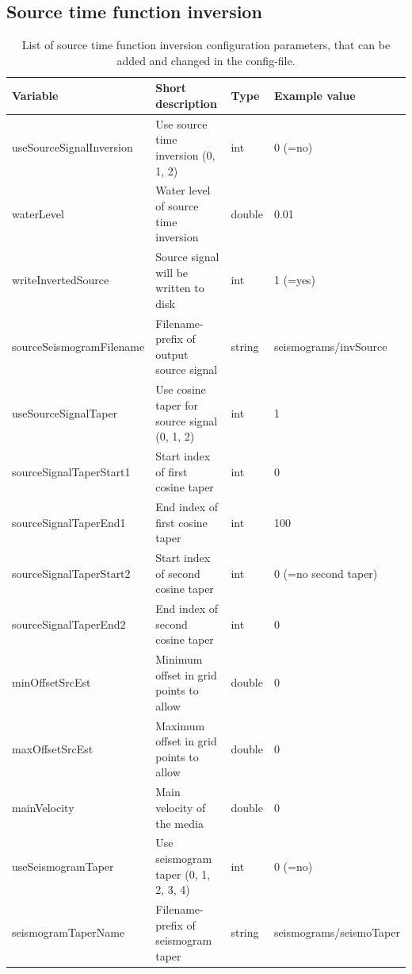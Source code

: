\documentclass[pdftex,a4paper,parskip,listof=totoc,bibliography=totoc,onehalfspacing,12pt]{scrreprt}
\begin{document}
\subsection{Source time function inversion}
\begin{table}[h!]
\caption[List of source time function inversion configuration parameters.]{List of source time function inversion configuration parameters, that can be added and changed in the config-file.}\label{tab:config_sourcetime}
\centering
\begin{adjustbox}{width=1\textwidth,center=\textwidth}
	\begin{tabular}{llll}
	\toprule
         Variable                 & Short description                                                   & Type   & Example value \\
	\midrule
         useSourceSignalInversion & Use source time inversion (0, 1, 2)                                          &  int   & 0 (=no) \\
         waterLevel               & Water level of source time inversion                                & double & 0.01 \\
         writeInvertedSource      & Source signal will be written to disk                               &  int   & 1 (=yes) \\
         sourceSeismogramFilename & Filename-prefix of output source signal                               & string & seismograms/invSource \\
         useSourceSignalTaper     & Use cosine taper for source signal (0, 1, 2)                                  &  int   & 1 \\
         sourceSignalTaperStart1  & Start index of first cosine taper                                   &  int   & 0 \\
         sourceSignalTaperEnd1    & End index of first cosine taper                                     &  int   & 100 \\
         sourceSignalTaperStart2  & Start index of second cosine taper                                  &  int   & 0 (=no second taper) \\
         sourceSignalTaperEnd2    & End index of second cosine taper                                    &  int   & 0 \\
         minOffsetSrcEst          & Minimum offset in grid points to allow                              &  double   & 0 \\
         maxOffsetSrcEst          & Maximum offset in grid points to allow                              &  double   & 0 \\  
         mainVelocity          & Main velocity of the media                              &  double   & 0 \\
         useSeismogramTaper       & Use seismogram taper (0, 1, 2, 3, 4)               &  int   & 0 (=no) \\
         seismogramTaperName      & Filename-prefix of seismogram taper                                   & string & seismograms/seismoTaper \\
	\bottomrule
	\end{tabular}
	\end{adjustbox}
\end{table}
\end{document}
